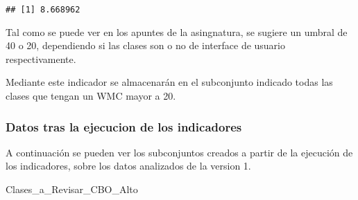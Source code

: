 \documentclass[
]{article}
\newenvironment{Shaded}{\begin{snugshade}}{\end{snugshade}}
\newcommand{\DecValTok}[1]{\textcolor[rgb]{0.00,0.00,0.81}{#1}}
\newcommand{\NormalTok}[1]{#1}
\newcommand{\OtherTok}[1]{\textcolor[rgb]{0.56,0.35,0.01}{#1}}
\newcommand{\SpecialCharTok}[1]{\textcolor[rgb]{0.00,0.00,0.00}{#1}}
\begin{document}
\begin{verbatim}
## [1] 8.668962
\end{verbatim}

Tal como se puede ver en los apuntes de la asingnatura, se sugiere un
umbral de 40 o 20, dependiendo si las clases son o no de interface de
usuario respectivamente.

Mediante este indicador se almacenarán en el subconjunto indicado todas
las clases que tengan un WMC mayor a 20.

\begin{Shaded}
\end{Shaded}

\hypertarget{datos-tras-la-ejecucion-de-los-indicadores}{%
\subsubsection{Datos tras la ejecucion de los
indicadores}\label{datos-tras-la-ejecucion-de-los-indicadores}}

A continuación se pueden ver los subconjuntos creados a partir de la
ejecución de los indicadores, sobre los datos analizados de la version
1.

\begin{Shaded}
\begin{Highlighting}[]
\NormalTok{Clases\_a\_Revisar\_CBO\_Alto}
\end{Highlighting}
\end{Shaded}
\end{document}
